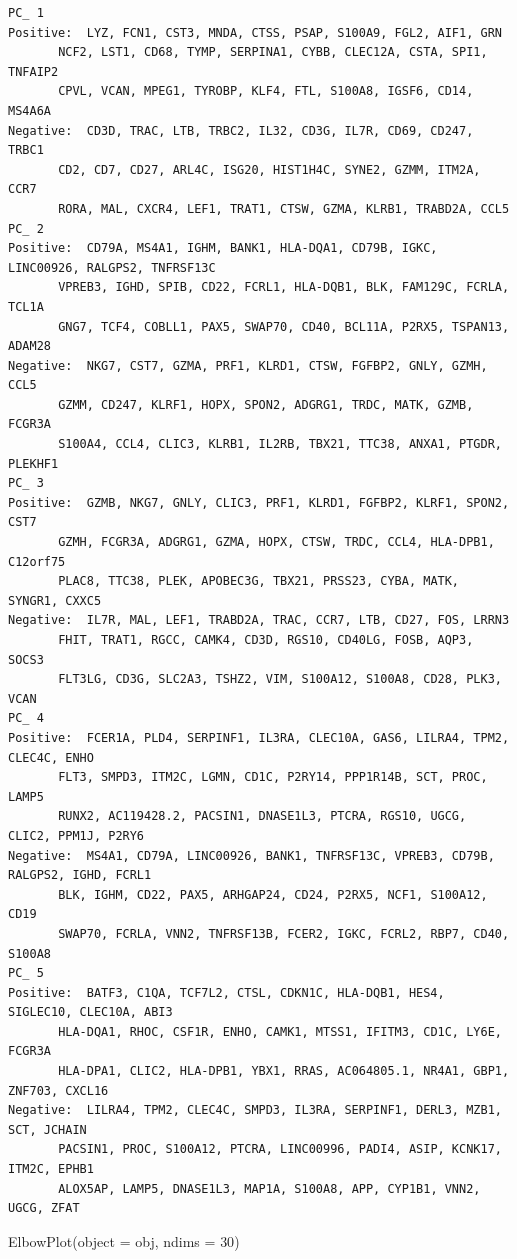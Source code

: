 \documentclass[
  letterpaper,
  DIV=11,
  numbers=noendperiod]{scrartcl}
\newenvironment{Shaded}{\begin{snugshade}}{\end{snugshade}}
\newcommand{\AttributeTok}[1]{\textcolor[rgb]{0.40,0.45,0.13}{#1}}
\newcommand{\DecValTok}[1]{\textcolor[rgb]{0.68,0.00,0.00}{#1}}
\newcommand{\FunctionTok}[1]{\textcolor[rgb]{0.28,0.35,0.67}{#1}}
\newcommand{\NormalTok}[1]{\textcolor[rgb]{0.00,0.23,0.31}{#1}}
\begin{document}
\begin{verbatim}
PC_ 1 
Positive:  LYZ, FCN1, CST3, MNDA, CTSS, PSAP, S100A9, FGL2, AIF1, GRN 
       NCF2, LST1, CD68, TYMP, SERPINA1, CYBB, CLEC12A, CSTA, SPI1, TNFAIP2 
       CPVL, VCAN, MPEG1, TYROBP, KLF4, FTL, S100A8, IGSF6, CD14, MS4A6A 
Negative:  CD3D, TRAC, LTB, TRBC2, IL32, CD3G, IL7R, CD69, CD247, TRBC1 
       CD2, CD7, CD27, ARL4C, ISG20, HIST1H4C, SYNE2, GZMM, ITM2A, CCR7 
       RORA, MAL, CXCR4, LEF1, TRAT1, CTSW, GZMA, KLRB1, TRABD2A, CCL5 
PC_ 2 
Positive:  CD79A, MS4A1, IGHM, BANK1, HLA-DQA1, CD79B, IGKC, LINC00926, RALGPS2, TNFRSF13C 
       VPREB3, IGHD, SPIB, CD22, FCRL1, HLA-DQB1, BLK, FAM129C, FCRLA, TCL1A 
       GNG7, TCF4, COBLL1, PAX5, SWAP70, CD40, BCL11A, P2RX5, TSPAN13, ADAM28 
Negative:  NKG7, CST7, GZMA, PRF1, KLRD1, CTSW, FGFBP2, GNLY, GZMH, CCL5 
       GZMM, CD247, KLRF1, HOPX, SPON2, ADGRG1, TRDC, MATK, GZMB, FCGR3A 
       S100A4, CCL4, CLIC3, KLRB1, IL2RB, TBX21, TTC38, ANXA1, PTGDR, PLEKHF1 
PC_ 3 
Positive:  GZMB, NKG7, GNLY, CLIC3, PRF1, KLRD1, FGFBP2, KLRF1, SPON2, CST7 
       GZMH, FCGR3A, ADGRG1, GZMA, HOPX, CTSW, TRDC, CCL4, HLA-DPB1, C12orf75 
       PLAC8, TTC38, PLEK, APOBEC3G, TBX21, PRSS23, CYBA, MATK, SYNGR1, CXXC5 
Negative:  IL7R, MAL, LEF1, TRABD2A, TRAC, CCR7, LTB, CD27, FOS, LRRN3 
       FHIT, TRAT1, RGCC, CAMK4, CD3D, RGS10, CD40LG, FOSB, AQP3, SOCS3 
       FLT3LG, CD3G, SLC2A3, TSHZ2, VIM, S100A12, S100A8, CD28, PLK3, VCAN 
PC_ 4 
Positive:  FCER1A, PLD4, SERPINF1, IL3RA, CLEC10A, GAS6, LILRA4, TPM2, CLEC4C, ENHO 
       FLT3, SMPD3, ITM2C, LGMN, CD1C, P2RY14, PPP1R14B, SCT, PROC, LAMP5 
       RUNX2, AC119428.2, PACSIN1, DNASE1L3, PTCRA, RGS10, UGCG, CLIC2, PPM1J, P2RY6 
Negative:  MS4A1, CD79A, LINC00926, BANK1, TNFRSF13C, VPREB3, CD79B, RALGPS2, IGHD, FCRL1 
       BLK, IGHM, CD22, PAX5, ARHGAP24, CD24, P2RX5, NCF1, S100A12, CD19 
       SWAP70, FCRLA, VNN2, TNFRSF13B, FCER2, IGKC, FCRL2, RBP7, CD40, S100A8 
PC_ 5 
Positive:  BATF3, C1QA, TCF7L2, CTSL, CDKN1C, HLA-DQB1, HES4, SIGLEC10, CLEC10A, ABI3 
       HLA-DQA1, RHOC, CSF1R, ENHO, CAMK1, MTSS1, IFITM3, CD1C, LY6E, FCGR3A 
       HLA-DPA1, CLIC2, HLA-DPB1, YBX1, RRAS, AC064805.1, NR4A1, GBP1, ZNF703, CXCL16 
Negative:  LILRA4, TPM2, CLEC4C, SMPD3, IL3RA, SERPINF1, DERL3, MZB1, SCT, JCHAIN 
       PACSIN1, PROC, S100A12, PTCRA, LINC00996, PADI4, ASIP, KCNK17, ITM2C, EPHB1 
       ALOX5AP, LAMP5, DNASE1L3, MAP1A, S100A8, APP, CYP1B1, VNN2, UGCG, ZFAT 
\end{verbatim}

\begin{Shaded}
\begin{Highlighting}[]
\FunctionTok{ElbowPlot}\NormalTok{(}\AttributeTok{object =}\NormalTok{ obj, }\AttributeTok{ndims =} \DecValTok{30}\NormalTok{)}
\end{Highlighting}
\end{Shaded}
\end{document}
